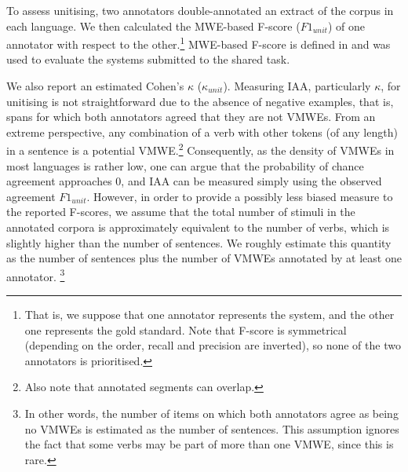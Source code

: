 \documentclass[output=paper,
modfonts,
]{langscibook}
\begin{document}
To assess unitising, two annotators double-annotated an extract of the corpus in each language. We then calculated the MWE-based F-score ($F1_{unit}$) of one annotator with respect to the other.\footnote{That is, we suppose that one annotator represents the system, and the other one represents the gold standard. Note that F-score is symmetrical (depending on the order, recall and precision are inverted), so none of the two annotators is prioritised.} MWE-based F-score is defined in \citet{MWEWorkshop} and was used to evaluate the systems submitted to the shared task.  %

We also report an estimated Cohen's $\kappa$ ($\kappa_{unit}$).  %
Measuring IAA, particularly $\kappa$, for unitising is not straightforward due to the absence of negative examples, that is, spans for which both annotators agreed that they are not VMWEs. From an extreme perspective, any combination of a verb with other tokens (of any length) in a sentence is a potential VMWE.\footnote{Also note that annotated segments can  overlap.} Consequently, as the density of VMWEs in most languages is rather low, one can argue that the probability of chance agreement approaches 0, %
and IAA can be measured simply using the observed agreement $F1_{unit}$. However, in order to provide 
a possibly less biased measure to the reported F-scores, we assume that the total number of stimuli in the annotated corpora is 
approximately equivalent to the number of %
verbs, which %
is slightly higher than the number of sentences. We roughly estimate this quantity as the number of sentences plus the number of VMWEs annotated by at least one annotator.
\footnote{In other words, the number of items on which both annotators agree as being no VMWEs is estimated as the number of sentences. 
This assumption ignores the fact that some verbs may be part of more than one VMWE, since this is rare.}
\end{document}
